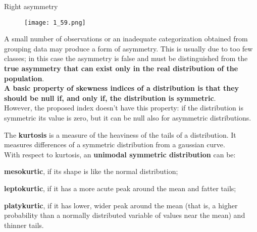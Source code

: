 \begin{frame}
  \vspace*{.5cm}
  \centering
  Right asymmetry\\
  \begin{figure}
  \centering
  \texttt{[image: 1\_59.png]}
  \end{figure}
\end{frame}

\begin{frame}
  \vspace*{.25cm}
  A small number of observations or an inadequate categorization obtained from grouping data may produce a form of asymmetry. This is usually due to too few classes; in this case the asymmetry is false and must be distinguished from the \textbf{true asymmetry that can exist only in the real distribution of the population}.\\
  \vspace*{.5cm}
  \textbf{A basic property of skewness indices of a distribution is that they should be null if, and only if, the distribution is symmetric}.\\
  \vspace*{.25cm}
  However, the proposed index doesn't have this property: if the distribution is symmetric its value is zero, but it can be null also for asymmetric distributions.
\end{frame}


\begin{frame}
  \begin{small}
    \vspace*{.1cm}
    The \textbf{kurtosis} is a measure of the heaviness of the tails of a distribution. It measures differences of a symmetric distribution from a gaussian curve.\\
    \vspace*{.25cm}
    With respect to kurtosis, an \textbf{unimodal symmetric distribution} can be:\\
    \begin{itemize}
      \begin{footnotesize}
        \item \textbf{mesokurtic}, if its shape is like the normal distribution;\\
        \item \textbf{leptokurtic}, if it has a more acute peak around the mean and fatter tails;\\
        \item \textbf{platykurtic}, if it has lower, wider peak around the mean (that is, a higher probability than a normally distributed variable of values near the mean) and thinner tails.
      \end{footnotesize}
    \end{itemize}
  \end{small}
\end{frame}

